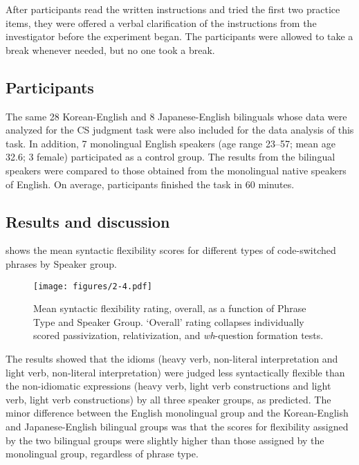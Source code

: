 After participants read the written instructions and tried the first two practice items, they were offered a verbal clarification of the instructions from the investigator before the experiment began. The participants were allowed to take a break whenever needed, but no one took a break. 

\subsection{Participants} \label{ch2:sect:2.2.3}  

The same 28 Korean-English and 8 Japanese-English bilinguals whose data were analyzed for the \ac{CS} judgment task were also included for the data analysis of this task. In addition, 7 monolingual English speakers (age range 23--57; mean age 32.6; 3 female) participated as a control group. The results from the bilingual speakers were compared to those obtained from the monolingual native speakers of English. On average, participants finished the task in 60 minutes.

\subsection{Results and discussion} \label{ch2:sect:2.2.4}

 shows the mean syntactic flexibility scores for different types of code-switched phrases by Speaker group.


\begin{figure}
\caption{Mean syntactic flexibility rating, overall, as a function of Phrase Type and Speaker Group. ‘Overall’ rating collapses individually scored passivization, relativization, and \textit{wh}-question formation tests.} \label{fig:2.4}
\texttt{[image: figures/2-4.pdf]}
\end{figure}

The results showed that the idioms (heavy verb, non-literal interpretation and light verb, non-literal interpretation) were judged less syntactically flexible than the non-idiomatic expressions (heavy verb, light verb constructions and light verb, light verb constructions) by all three speaker groups, as predicted. The minor difference between the English monolingual group and the Korean-English and Japanese-English bilingual groups was that the scores for flexibility assigned by the two bilingual groups were slightly higher than those assigned by the monolingual group, regardless of phrase type.

